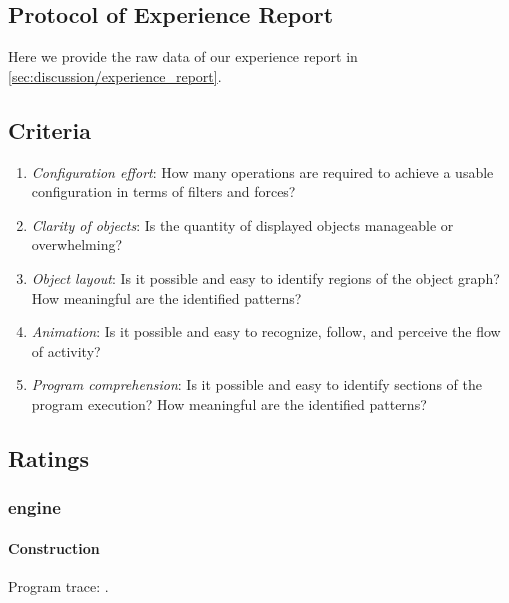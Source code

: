\begin{figure*}[b!]
\raggedright

\section{Protocol of Experience Report}

\label{sec:appendix/experience_report}

Here we provide the raw data of our experience report in \autoref{sec:discussion/experience_report}.

\subsection{Criteria}

\begin{enumerate}
	\item \emph{Configuration effort}: How many operations are required to achieve a usable configuration in terms of filters and forces?
	\item \emph{Clarity of objects}: Is the quantity of displayed objects manageable or overwhelming?
	\item \emph{Object layout}: Is it possible and easy to identify regions of the object graph? How meaningful are the identified patterns?
	\item \emph{Animation}: Is it possible and easy to recognize, follow, and perceive the flow of activity?
	\item \emph{Program comprehension}: Is it possible and easy to identify sections of the program execution? How meaningful are the identified patterns?
\end{enumerate}

\subsection{Ratings}

{\setlength{\leftmargini}{.25cm}

\subsubsection{ engine}

\paragraph{Construction}

Program trace: .\\[\parskip]

}
\end{figure*}
